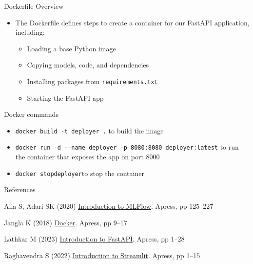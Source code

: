 \documentclass[
  ignorenonframetext,
]{beamer}
\newlength{\cslhangindent}
\newenvironment{CSLReferences}[2] %
 {\begin{list}{}{%
  \setlength{\itemindent}{0pt}
  \setlength{\leftmargin}{0pt}
  \setlength{\parsep}{0pt}
  \ifodd #1
   \setlength{\leftmargin}{\cslhangindent}
   \setlength{\itemindent}{-1\cslhangindent}
  \fi
  \setlength{\itemsep}{#2\baselineskip}}}
 {\end{list}}
\providecommand{\tightlist}{%
  \setlength{\itemsep}{0pt}\setlength{\parskip}{0pt}}
\begin{document}
\begin{frame}[fragile]
\begin{block}{Dockerfile Overview}
\label{dockerfile-overview}
\begin{itemize}
\tightlist
\item
  The Dockerfile defines steps to create a container for our FastAPI
  application, including:

  \begin{itemize}
  \tightlist
  \item
    Loading a base Python image
  \item
    Copying models, code, and dependencies
  \item
    Installing packages from \texttt{requirements.txt}
  \item
    Starting the FastAPI app
  \end{itemize}
\end{itemize}
\end{block}
\end{frame}

\begin{frame}[fragile]
\begin{block}{Docker commands}
\label{docker-commands}
\begin{itemize}
\tightlist
\item
  \texttt{docker\ build\ -t\ deployer\ .} to build the image
\item
  \texttt{docker\ run\ -d\ -\/-name\ deployer\ -p\ 8080:8080\ deployer:latest}
  to run the container that exposes the app on port 8000
\item
  \texttt{docker\ stop\textasciigrave{}\textasciigrave{}deployer}to stop
  the container
\end{itemize}
\end{block}
\end{frame}

\begin{frame}[allowframebreaks]{References}
\label{references}
\label{refs}
\begin{CSLReferences}{1}{1}
Alla S, Adari SK (2020)
\href{https://doi.org/10.1007/978-1-4842-6549-9_4}{Introduction to
MLFlow}. Apress, pp 125--227

Jangla K (2018)
\href{https://doi.org/10.1007/978-1-4842-3936-0_2}{Docker}. Apress, pp
9--17

Lathkar M (2023)
\href{https://doi.org/10.1007/978-1-4842-9178-8_1}{Introduction to
FastAPI}. Apress, pp 1--28

Raghavendra S (2022)
\href{https://doi.org/10.1007/978-1-4842-8983-9_1}{Introduction to
Streamlit}. Apress, pp 1--15

\end{CSLReferences}
\end{frame}
\end{document}
